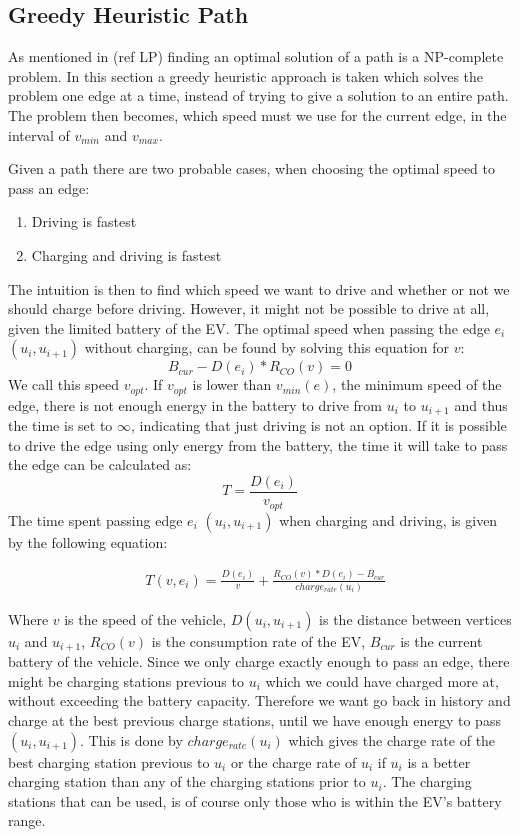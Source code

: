 \subsection{Greedy Heuristic Path}\label{sec:greedy}
As mentioned in (ref LP) finding an optimal solution of a path is a NP-complete problem. In this section a greedy heuristic approach is taken which solves the problem one edge at a time, instead of trying to give a solution to an entire path. The problem then becomes, which speed must we use for the current edge, in the interval of $v_{min}$ and $v_{max}$.

Given a path there are two probable cases, when choosing the optimal speed to pass an edge:
\begin{enumerate}
	\item Driving is fastest
	\item Charging and driving is fastest
\end{enumerate}

The intuition is then to find which speed we want to drive and whether or not we should charge before driving. However, it might not be possible to drive at all, given the limited battery of the EV. The optimal speed when passing the edge $e_i$ $(u_i, u_{i+1})$ without charging, can be found by solving this equation for $v$:
\[B_{cur} - D(e_i) * R_{CO}(v) = 0\] 
We call this speed $v_{opt}$. If $v_{opt}$ is lower than $v_{min}(e)$, the minimum speed of the edge, there is not enough energy in the battery to drive from $u_i$ to $u_{i+1}$ and thus the time is set to $\infty$, indicating that just driving is not an option. If it is possible to drive the edge using only energy from the battery, the time it will take to pass the edge can be calculated as:
 \[T = \frac{D(e_i)}{v_{opt}} \] 
The time spent passing edge $e_i$ $(u_i, u_{i+1})$ when charging and driving, is given by the following equation:

\begin{equation*}
\begin{aligned}
 & T(v,e_i) = \frac{D(e_i)}{v} + \frac{R_{CO}(v) * D(e_i) - B_{cur}}{charge_{rate}(u_{i})}
\end{aligned}
\end{equation*}\label{eq:drivingAndCharging}

Where $v$ is the speed of the vehicle, $D(u_i, u_{i+1})$ is the distance between vertices $u_i$ and $u_{i+1}$, $R_{CO}(v)$ is the consumption rate of the EV, $B_{cur}$ is the current battery of the vehicle. Since we only charge exactly enough to pass an edge, there might be charging stations previous to $u_i$ which we could have charged more at, without exceeding the battery capacity. Therefore we want go back in history and charge at the best previous charge stations, until we have enough energy to pass $(u_i, u_{i+1})$. This is done by $charge_{rate}(u_i)$ which gives the charge rate of the best charging station previous to $u_{i}$ or the charge rate of $u_i$ if $u_i$ is a better charging station than any of the charging stations prior to $u_i$. The charging stations that can be used, is of course only those who is within the EV's battery range.

